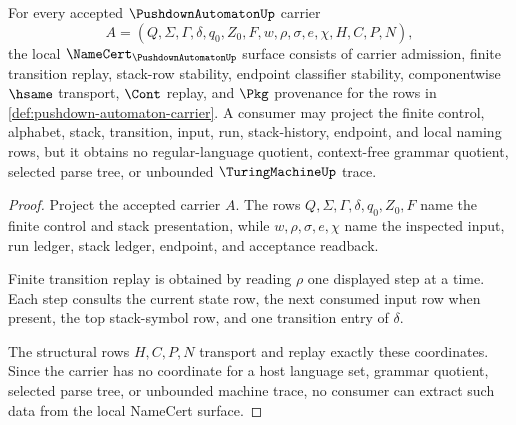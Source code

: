 \begin{theorem}
\label{thm:pushdown-automaton-namecert-obligations}
For every accepted $\PushdownAutomatonUp$ carrier
$$
A=(Q,\Sigma,\Gamma,\delta,q_0,Z_0,F,w,\rho,\sigma,e,\chi,H,C,P,N),
$$
the local $\NameCert_{\PushdownAutomatonUp}$ surface consists of carrier
admission, finite transition replay, stack-row stability, endpoint classifier
stability, componentwise $\hsame$ transport, $\Cont$ replay, and $\Pkg$
provenance for the rows in
\autoref{def:pushdown-automaton-carrier}. A consumer may project the finite
control, alphabet, stack, transition, input, run, stack-history, endpoint, and
local naming rows, but it obtains no regular-language quotient, context-free
grammar quotient, selected parse tree, or unbounded $\TuringMachineUp$ trace.
\end{theorem}
\begin{proof}
Project the accepted carrier $A$. The rows $Q,\Sigma,\Gamma,\delta,q_0,Z_0,F$
name the finite control and stack presentation, while $w,\rho,\sigma,e,\chi$
name the inspected input, run ledger, stack ledger, endpoint, and acceptance
readback.

Finite transition replay is obtained by reading $\rho$ one displayed step at a
time. Each step consults the current state row, the next consumed input row
when present, the top stack-symbol row, and one transition entry of $\delta$.

The structural rows $H,C,P,N$ transport and replay exactly these coordinates.
Since the carrier has no coordinate for a host language set, grammar quotient,
selected parse tree, or unbounded machine trace, no consumer can extract such
data from the local NameCert surface.
\end{proof}

